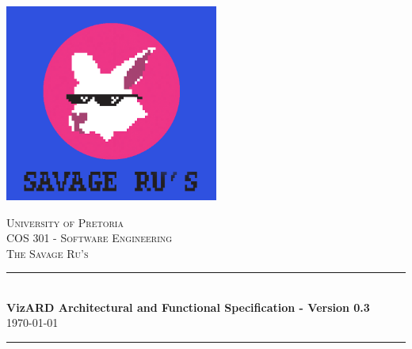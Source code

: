 \documentclass[a4paper,12pt]{article}
\begin{document}
\begin{titlepage}

\newcommand{\HRule}{\rule{\linewidth}{0.5mm}} %

\center %
 
\begin{center}
	\includegraphics[width=7cm]{../Images/SavageRus.png}
\end{center}	
\vfill
\textsc{\LARGE University of Pretoria}\\[1.5cm]
\textsc{\Large COS 301 - Software Engineering}\\[0.5cm]
\textsc{\large The Savage Ru's}\\[0.5cm]


\HRule \\[0.4cm]
{ \huge \bfseries VizARD Architectural and Functional Specification - Version 0.3}\\[0.4cm] %
{\large \today}
\HRule \\[1.5cm]
 


\end{titlepage}
\end{document}
